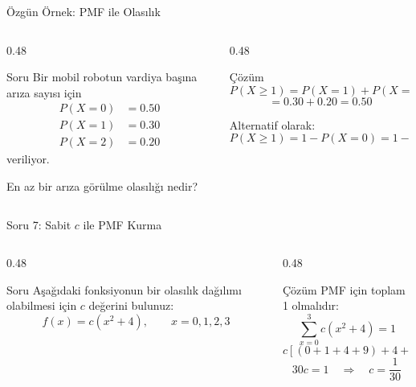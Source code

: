 \documentclass[light]{lutbeamer}
\begin{document}
\begin{frame}{Özgün Örnek: PMF ile Olasılık}
\small
\begin{columns}[T,onlytextwidth]
    \begin{column}{0.48\textwidth}
        \begin{block}{Soru}
            Bir mobil robotun vardiya başına arıza sayısı için
            \[
            \begin{aligned}
            P(X=0)&=0.50 \\
            P(X=1)&=0.30 \\
            P(X=2)&=0.20
            \end{aligned}
            \]
            veriliyor.

            \vspace{0.15cm}
            En az bir arıza görülme olasılığı nedir?
        \end{block}
    \end{column}
    \begin{column}{0.48\textwidth}
        \begin{exampleblock}{Çözüm}
            \[
            P(X \ge 1)=P(X=1)+P(X=2)
            \]
            \[
            =0.30+0.20=0.50
            \]

            Alternatif olarak:
            \[
            P(X \ge 1)=1-P(X=0)=1-0.50=0.50
            \]
        \end{exampleblock}
    \end{column}
\end{columns}
\end{frame}

\begin{frame}{Soru 7: Sabit $c$ ile PMF Kurma}
\scriptsize
\begin{columns}[T,onlytextwidth]
    \begin{column}{0.48\textwidth}
        \begin{block}{Soru}
            Aşağıdaki fonksiyonun bir olasılık dağılımı olabilmesi için $c$ değerini bulunuz:
            \[
            f(x)=c(x^2+4), \qquad x=0,1,2,3
            \]
        \end{block}
    \end{column}
    \begin{column}{0.48\textwidth}
        \begin{exampleblock}{Çözüm}
            PMF için toplam 1 olmalıdır:
            \[
            \sum_{x=0}^{3} c(x^2+4)=1
            \]
            \[
            c[(0+1+4+9)+4+4+4+4]=1
            \]
            \[
            30c=1 \quad \Rightarrow \quad c=\frac{1}{30}
            \]
        \end{exampleblock}
    \end{column}
\end{columns}
\end{frame}
\end{document}
